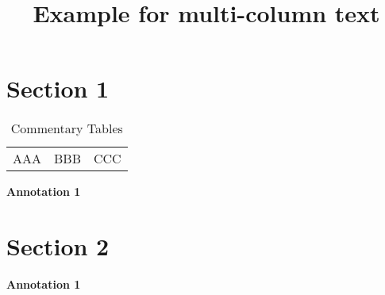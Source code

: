 \documentclass{article}
\newcommand\header[1]{\par\noindent\textbf{#1}}
\begin{document}
\title{Example for multi-column text}
\maketitle

\section*{Section 1}
\begin{paracol}{2}
	\lipsum[1]
	\switchcolumn
	\begin{table}
		\caption{Commentary Tables}
		\begin{tabular}{c|cc}
			AAA & BBB & CCC
		\end{tabular}
	\end{table}
\end{paracol}

\vspace{0.3in}
\begin{paracol}{2}
	\lipsum[3]
	\switchcolumn
	\header{Annotation 1}
	\lipsum[4]
\end{paracol}

\section*{Section 2}
\lipsum[3]

\vspace{0.3in}

\begin{paracol}{2}
	\lipsum[3]
	\switchcolumn
	\header{Annotation 1}
	\lipsum[4]
\end{paracol}
\end{document}
